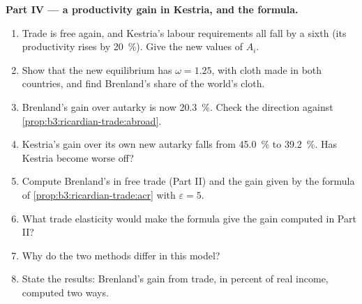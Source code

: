 \begin{problem}
\medskip\noindent\textbf{Part IV --- a productivity gain in Kestria, and the
formula.}
\begin{enumerate}[resume]
\item Trade is free again, and Kestria's labour requirements all fall by a sixth
(its productivity rises by 20~\%). Give the new values of $A_i$.
\item Show that the new equilibrium has $\omega = 1.25$, with cloth made in both
countries, and find Brenland's share of the world's cloth.
\item Brenland's gain over autarky is now 20.3~\%. Check the direction against
\cref{prop:b3:ricardian-trade:abroad}.
\item Kestria's gain over its own new autarky falls from 45.0~\% to 39.2~\%. Has
Kestria become worse off?
\item Compute Brenland's  in free trade (Part II) and
the gain given by the formula of \cref{prop:b3:ricardian-trade:acr} with $\varepsilon =
5$.
\item What trade elasticity would make the formula give the gain computed in
Part II?
\item Why do the two methods differ in this model?
\item State the results: Brenland's gain from trade, in percent of real income,
computed two ways.
\end{enumerate}
\end{problem}
